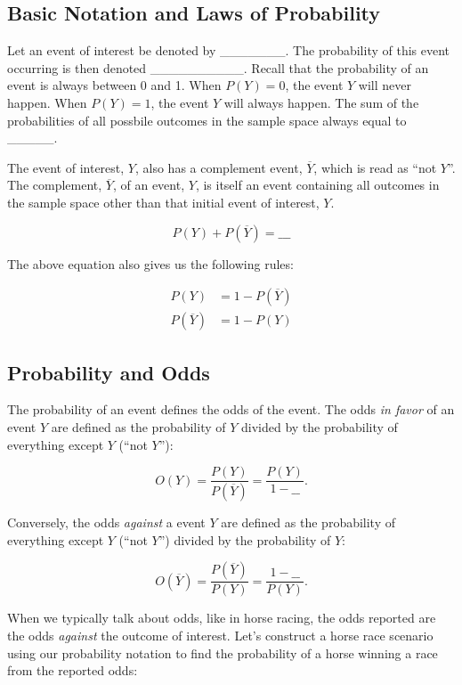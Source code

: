 \documentclass[]{book}
\theoremstyle{definition}
\theoremstyle{definition}
\theoremstyle{remark}
\begin{document}
\subsection{Basic Notation and Laws of
Probability}\label{basic-notation-and-laws-of-probability}

Let an event of interest be denoted by \_\_\_\_\_\_\_. The probability
of this event occurring is then denoted \_\_\_\_\_\_\_\_\_\_. Recall
that the probability of an event is always between 0 and 1. When
\(P(Y) = 0\), the event \(Y\) will never happen. When \(P(Y) = 1\), the
event \(Y\) will always happen. The sum of the probabilities of all
possbile outcomes in the sample space always equal to \_\_\_\_\_.

The event of interest, \(Y\), also has a complement event,
\(\overline{Y}\), which is read as ``not \(Y\)''. The complement,
\(\overline{Y}\), of an event, \(Y\), is itself an event containing all
outcomes in the sample space other than that initial event of interest,
\(Y\).

\[ P(Y) + P(\overline{Y}) = \_\_\_\]

The above equation also gives us the following rules:

\begin{equation}\label{eq:1}
\begin{split}
P(Y) & = 1 - P(\overline{Y}) \\
 P(\overline{Y}) & = 1 - P(Y)
\end{split}
\end{equation}

\subsection{Probability and Odds}\label{probability-and-odds}

The probability of an event defines the odds of the event. The odds
\emph{in favor} of an event \(Y\) are defined as the probability of
\(Y\) divided by the probability of everything except \(Y\) (``not
\(Y\)''):

\[ O(Y) = \dfrac{P(Y)}{P(\overline{Y})} = \dfrac{P(Y)}{1-\_\_}.\]

Conversely, the odds \emph{against} a event \(Y\) are defined as the
probability of everything except \(Y\) (``not \(Y\)'') divided by the
probability of \(Y\):

\[ O(\overline{Y}) = \dfrac{P(\overline{Y})}{P(Y)} = \dfrac{1-\_\_}{P(Y)}.\]

When we typically talk about odds, like in horse racing, the odds
reported are the odds \emph{against} the outcome of interest. Let's
construct a horse race scenario using our probability notation to find
the probability of a horse winning a race from the reported odds:
\end{document}
